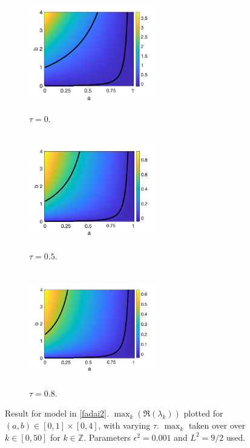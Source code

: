 \begin{figure}[H]
    \centering
    \begin{subfigure}[t]{0.32\textwidth}
        \centering
        \includegraphics[width=5.5cm,height = 5cm]{f2t0.png}
        \caption{$\tau=0$.}
        \label{}
    \end{subfigure}
    \hfill
    \begin{subfigure}[t]{0.32\textwidth}
        \centering
        \includegraphics[width=5.5cm,height = 5cm]{f2t05.png}
        \caption{$\tau=0.5$.}
        \label{}
    \end{subfigure}
    \hfill
    \begin{subfigure}[t]{0.32\textwidth}
        \centering
        \includegraphics[width=5.5cm,height = 5cm]{f2t08.png}
        \caption{$\tau=0.8$.}
        \label{}
    \end{subfigure}
    \caption{Result for model in \eqref{fadai2}. $\max_k(\Re(\lambda_k))$ plotted for $(a,b)\in[0,1]\times[0,4]$, with varying $\tau$. $\max_k$ taken over over $k\in[0,50]$ for $k\in\mathbb{Z}$. Parameters $\epsilon^2=0.001$ and $L^2=9/2$ used.}
    \label{fig:fad2}
\end{figure}
